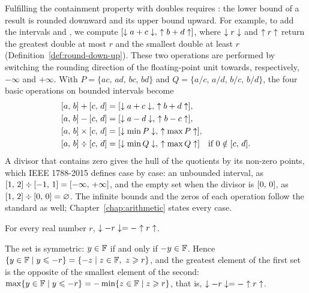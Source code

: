 \documentclass[12pt,a4paper,twoside,openright]{book}
\begin{document}
Fulfilling the containment property with doubles requires : the lower bound of a result is rounded downward and its upper
bound upward. For example, to add the intervals  and ,
we compute $[\downarrow a+c\downarrow,\,\uparrow b+d\uparrow]$, where $\downarrow r\downarrow$ and
$\uparrow r\uparrow$ return the greatest double at most $r$ and the smallest double
at least $r$ (Definition~\ref{def:round-down-up}). These two operations are
performed by switching the rounding direction of the floating-point unit
towards, respectively, $-\infty$ and $+\infty$. With
$P=\{ac,\,ad,\,bc,\,bd\}$ and $Q=\{a/c,\,a/d,\,b/c,\,b/d\}$, the four basic
operations on bounded intervals become
\begin{align*}
  \itv{a}{b}+\itv{c}{d} &= \itv{\roundDn{a+c}}{\roundUp{b+d}},\\
  \itv{a}{b}-\itv{c}{d} &= \itv{\roundDn{a-d}}{\roundUp{b-c}},\\
  \itv{a}{b}\times\itv{c}{d} &= \itv{\roundDn{\min P}}{\roundUp{\max P}},\\
  \itv{a}{b}\div\itv{c}{d} &= \itv{\roundDn{\min Q}}{\roundUp{\max Q}}
    \quad\text{if } 0\notin\itv{c}{d}.
\end{align*}
A divisor that contains zero gives the hull of the quotients by its
non-zero points, which IEEE 1788-2015 defines case by case: an unbounded
interval, as $[1,\,2]\div[-1,\,1]=[-\infty,\,+\infty]$, and the empty
set when the divisor is $[0,\,0]$, as $[1,\,2]\div[0,\,0]=\varnothing$. The infinite bounds and the zeros of
each operation follow the standard as well; Chapter~\ref{chap:arithmetic}
states every case.

\begin{Prop}\label{prop:round-neg}
For every real number $r$, $\downarrow-r\downarrow=-\uparrow r\uparrow$.
\end{Prop}
\demo The set \FSet{} is symmetric: $y\in\mathbb{F}$ if and only if
$-y\in\mathbb{F}$. Hence $\{y\in\FSet\mid y\leq-r\}=\{-z\mid z\in\FSet,\ z\geq
r\}$, and the greatest element of the first set is the opposite of the
smallest element of the second:
$\max\{y\in\mathbb{F}\mid y\leqslant-r\}=-\min\{z\in\mathbb{F}\mid z\geqslant r\}$, that is,
$\downarrow-r\downarrow=-\uparrow r\uparrow$.\boite
\end{document}
